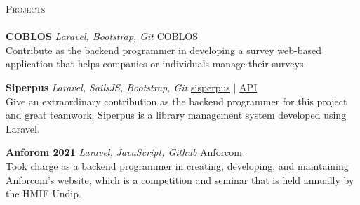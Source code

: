 \documentclass[a4paper]{article}
\newcommand{\lineunder} {
    \vspace*{-8pt} \\
    \hspace*{-18pt} \hrulefill \\
}
\newcommand{\header} [1] {
    {\hspace*{-18pt}\vspace*{6pt} \textsc{#1}}
    \vspace*{-6pt} \lineunder
}
\begin{document}
\header{Projects}
{\textbf{COBLOS}} {\sl Laravel, Bootstrap, Git} \hfill \href{https://coblos.herokuapp.com/}{COBLOS}\\
Contribute as the backend programmer in developing a survey web-based application that helps companies or individuals manage their surveys.\\
\vspace*{2mm}

{\textbf{Siperpus}} {\sl Laravel, SailsJS, Bootstrap, Git} \hfill \href{http://sisperpus.herokuapp.com/}{sisperpus} | \href{https://pbp-siperpus.herokuapp.com/}{API}\\
Give an extraordinary contribution as the backend programmer for this project and great teamwork. Siperpus is a library management system developed using Laravel. \\
\vspace*{2mm}

{\textbf{Anforom 2021}} {\sl Laravel, JavaScript, Github} \hfill \href{https://anforcom.com}{Anforcom}\\
Took charge as a backend programmer in creating, developing, and maintaining Anforcom's website, which is a competition and seminar that is held annually by the HMIF Undip.\\
\vspace*{2mm}



\end{document}
